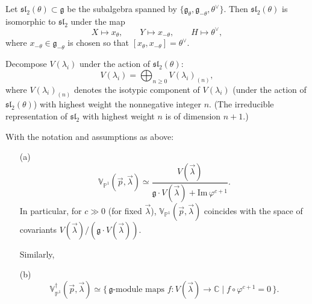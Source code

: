 \documentclass[12pt]{article}
\begin{document}
Let $\mathfrak{sl}_2(\theta)\subset\mathfrak g$ be the subalgebra spanned by
$\{ \mathfrak g_\theta, \mathfrak g_{-\theta}, \theta^\vee \}$.
Then $\mathfrak{sl}_2(\theta)$ is isomorphic to $\mathfrak{sl}_2$ under the map
\[
    X \mapsto x_\theta,\qquad
    Y \mapsto x_{-\theta},\qquad
    H \mapsto \theta^\vee,
\]
where $x_{-\theta} \in \mathfrak g_{-\theta}$ is chosen so that $[x_\theta, x_{-\theta}] = \theta^\vee$.

Decompose $V(\lambda_i)$ under the action of $\mathfrak{sl}_2(\theta)$:
\[
    V(\lambda_i) = \bigoplus_{n \ge 0} V(\lambda_i)_{(n)},
\]
where $V(\lambda_i)_{(n)}$ denotes the isotypic component of $V(\lambda_i)$ (under the action of $\mathfrak{sl}_2(\theta)$)
with highest weight the nonnegative integer $n$. (The irreducible representation of $\mathfrak{sl}_2$ with highest weight $n$ is of dimension $n+1$.)

\begin{theorem}[{\bf 2.3.2}]
    With the notation and assumptions as above:
    \begin{enumerate}
        \item[(a)]
              \[
                  \mathbb{V}_{\mathbb{P}^1}(\vec{p},\vec{\lambda})
                  \simeq
                  \frac{V(\vec{\lambda})}{\mathfrak g \cdot V(\vec{\lambda}) + \mathrm{Im}\,\varphi^{c+1}}.
              \]
              In particular, for $c \gg 0$ (for fixed $\vec{\lambda}$),
              $\mathbb{V}_{\mathbb{P}^1}(\vec{p},\vec{\lambda})$
              coincides with the space of covariants $V(\vec{\lambda})/(\mathfrak g \cdot V(\vec{\lambda}))$.

              Similarly,
        \item[(b)]
              \[
                  \mathbb{V}_{\mathbb{P}^1}^\dagger(\vec{p},\vec{\lambda})
                  \simeq
                  \{\, \mathfrak g\text{-module maps } f: V(\vec{\lambda}) \to \mathbb{C}
                  \mid f\circ\varphi^{c+1}=0 \,\}.
              \]
    \end{enumerate}
\end{theorem}
\end{document}
